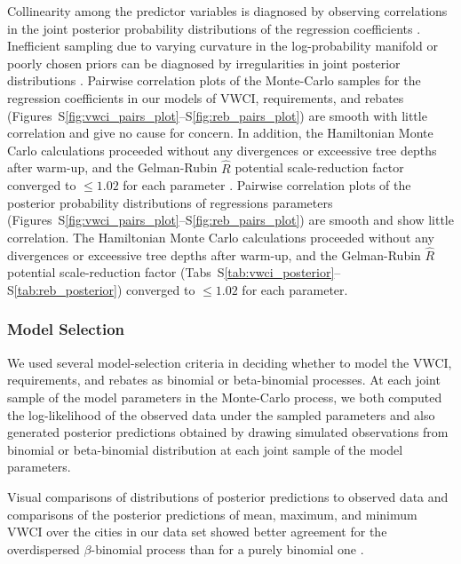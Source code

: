 \documentclass[draft]{agujournal}\usepackage{knitr}
\begin{document}
Collinearity among the predictor variables is diagnosed by observing correlations
in the joint posterior probability distributions of the regression coefficients
\citep[pp.~288--293]{stan:manual:2015}.
Inefficient sampling due to varying curvature in the log-probability manifold or
poorly chosen priors can be diagnosed by irregularities in joint posterior
distributions \citep[pp.~316--321]{stan:manual:2015}. Pairwise correlation
plots of the Monte-Carlo samples for the regression coefficients in our models
of VWCI, requirements, and rebates
(Figures~S\ref{fig:vwci_pairs_plot}--S\ref{fig:reb_pairs_plot}) are smooth with
little correlation and give no cause for concern.
In addition, the Hamiltonian Monte Carlo calculations proceeded without any
divergences or exceessive tree depths after warm-up, and the
Gelman-Rubin $\hat R$ potential
scale-reduction factor converged to $\le 1.02$ for each parameter
\citep{stan:manual:2015}.
\else
Pairwise correlation plots of the posterior probability distributions of
regressions parameters (Figures~S\ref{fig:vwci_pairs_plot}--S\ref{fig:reb_pairs_plot})
are smooth and show little correlation.
The Hamiltonian Monte Carlo calculations
proceeded without any divergences or exceessive tree depths after warm-up, and the
Gelman-Rubin
$\hat R$ potential scale-reduction factor
(Tabs~S\ref{tab:vwci_posterior}--S\ref{tab:reb_posterior}) converged to
$\le 1.02$ for each parameter.
\fi

\subsubsection*{Model Selection}

\iftrue
We used several model-selection criteria in deciding whether to model the VWCI,
requirements, and rebates as binomial or beta-binomial processes. At each joint
sample of the model parameters in the Monte-Carlo process, we both computed the
log-likelihood of the observed data under the sampled parameters and also
generated posterior predictions obtained by drawing simulated observations from
binomial or beta-binomial distribution at each joint sample of the model parameters.

Visual comparisons of distributions of posterior predictions to observed data and
comparisons of the posterior predictions of mean, maximum, and minimum VWCI over
the cities in our data set showed better agreement for the overdispersed
$\beta$-binomial process than for a purely binomial one \citep{gelman:bda:2014}.
\end{document}
